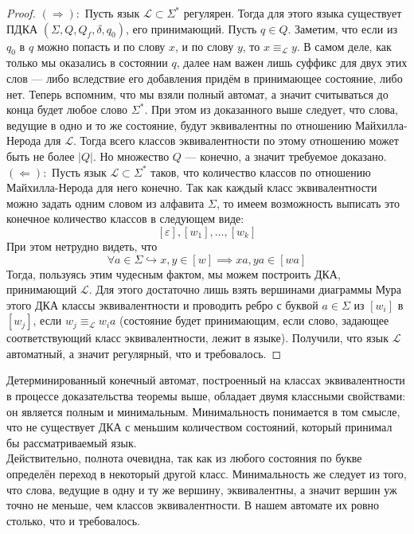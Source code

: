 \documentclass[11pt]{article}
\begin{document}
\begin{proof} $(\Longrightarrow): $ Пусть язык $\mathcal{L} \subset \Sigma^{\ast}$ регулярен. Тогда для этого языка существует ПДКА $(\Sigma, Q, Q_f, \delta, q_0)$, его принимающий. Пусть $q \in Q$. Заметим, что если из $q_0$ в $q$ можно попасть и по слову $x$, и по слову $y$, то $x \equiv_{\mathcal{L}} y$. В самом деле, как только мы оказались в состоянии $q$, далее нам важен лишь суффикс для двух этих слов --- либо вследствие его добавления придём в принимающее состояние, либо нет.
    Теперь вспомним, что мы взяли полный автомат, а значит считываться до конца будет любое слово $\Sigma^{\ast}$. При этом из доказанного выше следует, что слова, ведущие в одно и то же состояние, будут эквивалентны по отношению Майхилла-Нерода для $\mathcal{L}$. Тогда всего классов эквивалентности по этому отношению может быть не более $\left\lvert Q \right\rvert$. Но множество $Q$ --- конечно, а значит требуемое доказано. \\
    $(\Longleftarrow): $ Пусть язык $\mathcal{L} \subset \Sigma^{\ast}$ таков, что количество классов по отношению Майхилла-Нерода для него конечно. Так как каждый класс эквивалентности можно задать одним словом из алфавита $\Sigma$, то имеем возможность выписать это конечное количество классов в следующем виде:
    \[[\varepsilon], [w_1], \ldots, [w_k]\]
    При этом нетрудно видеть, что
    \[\forall a \in \Sigma \hookrightarrow x, y \in [w] \implies xa, ya \in [wa]\]
    Тогда, пользуясь этим чудесным фактом, мы можем построить ДКА, принимающий $\mathcal{L}$. Для этого достаточно лишь взять вершинами диаграммы Мура этого ДКА классы эквивалентности и проводить ребро с буквой $a \in \Sigma$ из $[w_i]$ в $[w_j]$, если $w_j \equiv_{\mathcal{L}} w_ia$ (состояние будет принимающим, если слово, задающее соответствующий класс эквивалентности, лежит в языке). Получили, что язык $\mathcal{L}$ автоматный, а значит регулярный, что и требовалось.
\end{proof}

\begin{remark} \label{rem:2.1}
    Детерминированный конечный автомат, построенный на классах эквивалентности в процессе доказательства теоремы выше, обладает двумя классными свойствами: он является полным и минимальным. Минимальность понимается в том смысле, что не существует ДКА с меньшим количеством состояний, который принимал бы рассматриваемый язык. \\
    Действительно, полнота очевидна, так как из любого состояния по букве определён переход в некоторый другой класс. Минимальность же следует из того, что слова, ведущие в одну и ту же вершину, эквивалентны, а значит вершин уж точно не меньше, чем классов эквивалентности. В нашем автомате их ровно столько, что и требовалось.
\end{remark}
\end{document}
